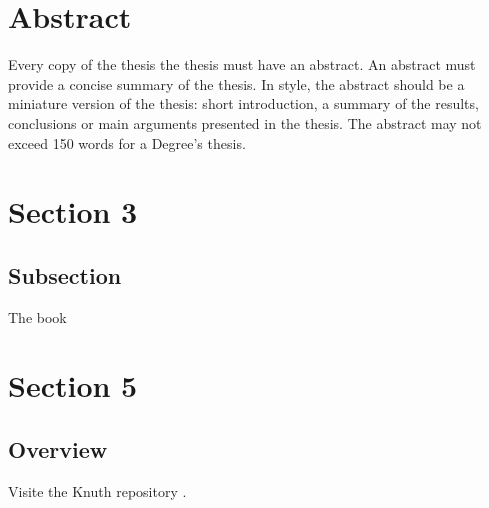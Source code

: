 \documentclass[a4paper,12pt]{article}
\begin{document}


\newpage
\tableofcontents

\newpage
\listoffigures
\lstlistoflistings
\listoftables

\newpage

\newpage
\section*{Abstract}
 {Every copy of the thesis the thesis must have an abstract. An abstract must provide a concise summary of the thesis. In style, the
  abstract should be a miniature version of the thesis: short introduction, a summary of the results, conclusions or main
  arguments presented in the thesis. The abstract may not exceed 150 words for a Degree’s thesis.}

\newpage



\newpage







\newpage
\section{Section 3}
\label{sec:sec3}

\lipsum[4]  \lipsum[5]
\lipsum[6]  \lipsum[7]

\subsection{Subsection}
\label{sec:subsec3.1}
The book \cite{latexcompanion} \lipsum[15]





\newpage
\section{Section 5}
\label{sec:sect5}
\lipsum[4]

\subsection{Overview}
\label{subsec:sect5Overview}
\lipsum[10]
Visite the Knuth repository \cite{knuthwebsite}.
\end{document}
